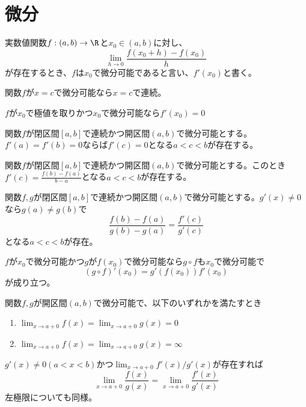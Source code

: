 \section{微分}

\begin{dfn}[常微分]
	実数値関数$f : (a, b) \to \R$と$x_0 \in (a, b)$に対し、
		\[\lim_{h \to 0} \frac{f(x_0 + h) - f(x_0)}{h}\]
	が存在するとき、$f$は$x_0$で微分可能であると言い、$f'(x_0)$と書く。
\end{dfn}
\begin{prop}
	関数$f$が$x = c$で微分可能なら$x = c$で連続。
\end{prop}
\begin{prop}
	$f$が$x_0$で極値を取りかつ$x_0$で微分可能なら$f'(x_0) = 0$
\end{prop}
\begin{thm}[ロルの定理]
	関数$f$が閉区間$[a, b]$で連続かつ開区間$(a, b)$で微分可能とする。$f'(a) = f'(b) = 0$ならば$f'(c) = 0$となる$a < c < b$が存在する。
\end{thm}
\begin{thm}[平均値の定理]
	関数$f$が閉区間$[a, b]$で連続かつ開区間$(a, b)$で微分可能とする。このとき$f'(c) = \frac{f(b) - f(a)}{b - a}$となる$a < c < b$が存在する。
\end{thm}
\begin{thm}[コーシーの平均値の定理]
	関数$f,g$が閉区間$[a, b]$で連続かつ開区間$(a, b)$で微分可能とする。$g'(x) \neq 0$なら$g(a) \neq g(b)$で
		\[\frac{f(b) - f(a)}{g(b) - g(a)} = \frac{f'(c)}{g'(c)}\]
	となる$a < c < b$が存在。
\end{thm}
\begin{prop}[合成関数の微分]
	$f$が$x_0$で微分可能かつ$g$が$f(x_0)$で微分可能なら$g\circ f$も$x_0$で微分可能で
		\[(g\circ f)'(x_0) = g'(f(x_0))f'(x_0)\]
	が成り立つ。
\end{prop}
\begin{prop}[逆関数の微分]
\end{prop}
\begin{thm}[ロピタルの定理]
	関数$f,g$が開区間$(a, b)$で微分可能で、以下のいずれかを満たすとき
	\begin{enumerate}
		\item $\lim_{x \to a+0} f(x) = \lim_{x \to a+0} g(x) = 0$
		\item $\lim_{x \to a+0} f(x) = \lim_{x \to a+0} g(x) = \infty$
	\end{enumerate}
	$g'(x) \neq 0(a < x < b)$かつ$\lim_{x \to a+0} f'(x)/g'(x)$が存在すれば
		\[\lim_{x \to a+0} \frac{f(x)}{g(x)} = \lim_{x \to a+0} \frac{f'(x)}{g'(x)}\]
	左極限についても同様。
\end{thm}
